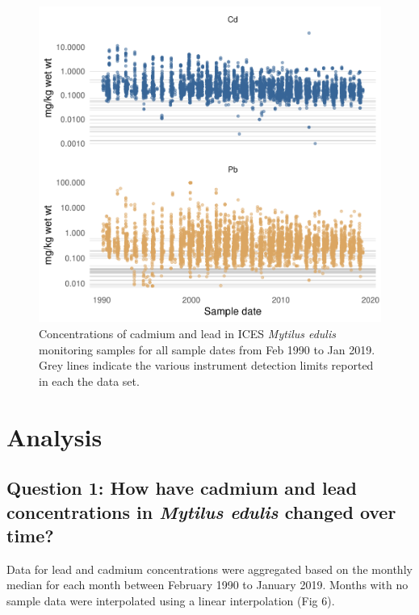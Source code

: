 \documentclass[
  12pt,
]{article}
\begin{document}
\begin{figure}
\centering
\includegraphics{McCrory_ENV972_Project_files/figure-latex/unnamed-chunk-6-1.pdf}
\caption{Concentrations of cadmium and lead in ICES \emph{Mytilus
edulis} monitoring samples for all sample dates from Feb 1990 to Jan
2019. Grey lines indicate the various instrument detection limits
reported in each the data set.}
\end{figure}

\newpage

\hypertarget{analysis}{%
\section{Analysis}\label{analysis}}

\hypertarget{question-1-how-have-cadmium-and-lead-concentrations-in-mytilus-edulis-changed-over-time}{%
\subsection{\texorpdfstring{Question 1: How have cadmium and lead
concentrations in \emph{Mytilus edulis} changed over
time?}{Question 1: How have cadmium and lead concentrations in Mytilus edulis changed over time?}}\label{question-1-how-have-cadmium-and-lead-concentrations-in-mytilus-edulis-changed-over-time}}

Data for lead and cadmium concentrations were aggregated based on the
monthly median for each month between February 1990 to January 2019.
Months with no sample data were interpolated using a linear
interpolation (Fig 6).
\end{document}
